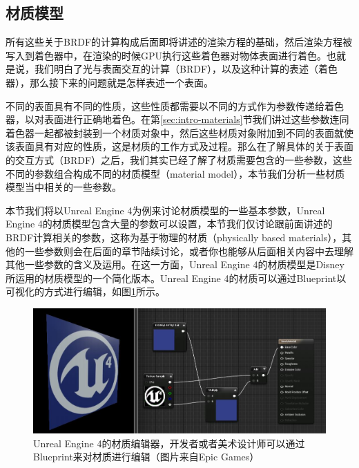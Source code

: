 \subsection{材质模型}\label{sec:intro-material-model}
所有这些关于BRDF的计算构成后面即将讲述的渲染方程的基础，然后渲染方程被写入到着色器中，在渲染的时候GPU执行这些着色器对物体表面进行着色。也就是说，我们明白了光与表面交互的计算（BRDF），以及这种计算的表述（着色器），那么接下来的问题就是怎样表述一个表面。

不同的表面具有不同的性质，这些性质都需要以不同的方式作为参数传递给着色器，以对表面进行正确地着色。在第\ref{sec:intro-materials}节我们讲过这些参数连同着色器一起都被封装到一个材质对象中，然后这些材质对象附加到不同的表面就使该表面具有对应的性质，这是材质的工作方式及过程。那么在了解具体的关于表面的交互方式（BRDF）之后，我们其实已经了解了材质需要包含的一些参数，这些不同的参数组合构成不同的材质模型（material model），本节我们分析一些材质模型当中相关的一些参数。

本节我们将以Unreal Engine 4为例来讨论材质模型的一些基本参数，Unreal Engine 4的材质模型包含大量的参数可以设置，本节我们仅讨论跟前面讲述的BRDF计算相关的参数，这称为基于物理的材质（physically based materials）\cite{m:PhysicallyBasedMaterials}，其他的一些参数则会在后面的章节陆续讨论，或者你也能够从后面相关内容中去理解其他一些参数的含义及运用。在这一方面，Unreal Engine 4的材质模型是Disney\cite{a:PhysicallyBasedShadingatDisney}所运用的材质模型的一个简化版本。Unreal Engine 4的材质可以通过Blueprint以可视化的方式进行编辑，如图\ref{f:intro-ue4-materials}所示。

\begin{figure}
\begin{fullwidth}
	\includegraphics[width=1.0\thewidth]{figures/intro/material-model}
	\caption{Unreal Engine 4的材质编辑器，开发者或者美术设计师可以通过Blueprint来对材质进行编辑（图片来自Epic Games）}
	\label{f:intro-ue4-materials}
\end{fullwidth}
\end{figure}

